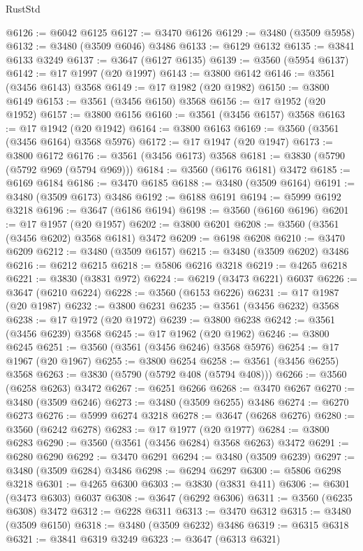 \begin{lexlean}{RustStd}
\begin{coremodule}
{\begin{coremodule}
{{{{{{{{{{{{{{{{{{{{{{{{{{{{{{{{{{{{{{{{{{{{{@6126 := @6042 @6125
@6127 := @3470 @6126
@6129 := @3480 (@3509 @5958)
@6132 := @3480 (@3509 @6046) @3486
@6133 := @6129 @6132
@6135 := @3841 @6133 @3249
@6137 := @3647 (@6127 @6135)
@6139 := @3560 (@5954 @6137)
@6142 := @17 @1997 (@20 @1997)
@6143 := @3800 @6142
@6146 := @3561 (@3456 @6143) @3568
@6149 := @17 @1982 (@20 @1982)
@6150 := @3800 @6149
@6153 := @3561 (@3456 @6150) @3568
@6156 := @17 @1952 (@20 @1952)
@6157 := @3800 @6156
@6160 := @3561 (@3456 @6157) @3568
@6163 := @17 @1942 (@20 @1942)
@6164 := @3800 @6163
@6169 := @3560 (@3561 (@3456 @6164) @3568 @5976)
@6172 := @17 @1947 (@20 @1947)
@6173 := @3800 @6172
@6176 := @3561 (@3456 @6173) @3568
@6181 := @3830 (@5790 (@5792 @969 (@5794 @969)))
@6184 := @3560 (@6176 @6181) @3472
@6185 := @6169 @6184
@6186 := @3470 @6185
@6188 := @3480 (@3509 @6164)
@6191 := @3480 (@3509 @6173) @3486
@6192 := @6188 @6191
@6194 := @5999 @6192 @3218
@6196 := @3647 (@6186 @6194)
@6198 := @3560 (@6160 @6196)
@6201 := @17 @1957 (@20 @1957)
@6202 := @3800 @6201
@6208 := @3560 (@3561 (@3456 @6202) @3568 @6181) @3472
@6209 := @6198 @6208
@6210 := @3470 @6209
@6212 := @3480 (@3509 @6157)
@6215 := @3480 (@3509 @6202) @3486
@6216 := @6212 @6215
@6218 := @5806 @6216 @3218
@6219 := @4265 @6218
@6221 := @3830 (@3831 @972)
@6224 := @6219 (@3473 @6221) @6037
@6226 := @3647 (@6210 @6224)
@6228 := @3560 (@6153 @6226)
@6231 := @17 @1987 (@20 @1987)
@6232 := @3800 @6231
@6235 := @3561 (@3456 @6232) @3568
@6238 := @17 @1972 (@20 @1972)
@6239 := @3800 @6238
@6242 := @3561 (@3456 @6239) @3568
@6245 := @17 @1962 (@20 @1962)
@6246 := @3800 @6245
@6251 := @3560 (@3561 (@3456 @6246) @3568 @5976)
@6254 := @17 @1967 (@20 @1967)
@6255 := @3800 @6254
@6258 := @3561 (@3456 @6255) @3568
@6263 := @3830 (@5790 (@5792 @408 (@5794 @408)))
@6266 := @3560 (@6258 @6263) @3472
@6267 := @6251 @6266
@6268 := @3470 @6267
@6270 := @3480 (@3509 @6246)
@6273 := @3480 (@3509 @6255) @3486
@6274 := @6270 @6273
@6276 := @5999 @6274 @3218
@6278 := @3647 (@6268 @6276)
@6280 := @3560 (@6242 @6278)
@6283 := @17 @1977 (@20 @1977)
@6284 := @3800 @6283
@6290 := @3560 (@3561 (@3456 @6284) @3568 @6263) @3472
@6291 := @6280 @6290
@6292 := @3470 @6291
@6294 := @3480 (@3509 @6239)
@6297 := @3480 (@3509 @6284) @3486
@6298 := @6294 @6297
@6300 := @5806 @6298 @3218
@6301 := @4265 @6300
@6303 := @3830 (@3831 @411)
@6306 := @6301 (@3473 @6303) @6037
@6308 := @3647 (@6292 @6306)
@6311 := @3560 (@6235 @6308) @3472
@6312 := @6228 @6311
@6313 := @3470 @6312
@6315 := @3480 (@3509 @6150)
@6318 := @3480 (@3509 @6232) @3486
@6319 := @6315 @6318
@6321 := @3841 @6319 @3249
@6323 := @3647 (@6313 @6321)
}}}}}}}}}}}}}}}}}}}}}}}}}}}}}}}}}}}}}}}}}}}}}
\end{coremodule}}
\end{coremodule}
\end{lexlean}
